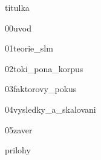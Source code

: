 \documentclass[12pt,a4paper]{report}
\begin{document}
{titulka}

{00uvod}

{01teorie_slm}

{02toki_pona_korpus}

{03faktorovy_pokus}

{04vysledky_a_skalovani}

{05zaver}

\newpage

\printbibliography[title={Použitá literatura},heading={bibintoc}]

\newpage

{prilohy}
\end{document}
